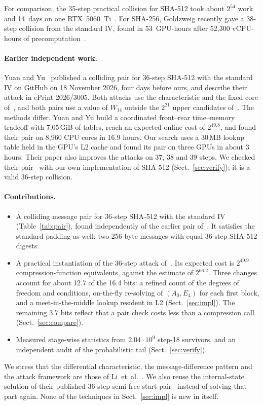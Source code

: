 \documentclass[11pt]{article}
\begin{document}
For comparison, the 35-step practical collision for SHA-512 took about $2^{54}$ work and 14~days on one RTX~5060~Ti~\cite{LLWS26}. For SHA-256, Goldzweig recently gave a 38-step collision from the standard IV, found in 53~GPU-hours after 52{,}300 vCPU-hours of precomputation~\cite{Gol26}.

\paragraph{Earlier independent work.} Yuan and Yu~\cite{YY26} published a colliding pair for 36-step SHA-512 with the standard IV on GitHub on 18 November 2026, four days before ours, and describe their attack in ePrint 2026/3005. Both attacks use the characteristic and the fixed core of~\cite{LZLLQZ26}, and both pairs use a value of $W_{14}$ outside the $2^{21}$ upper candidates of~\cite{LZLLQZ26}. The methods differ. Yuan and Yu build a coordinated front--rear time--memory tradeoff with 7.05\,GiB of tables, reach an expected online cost of $2^{49.8}$, and found their pair on 8{,}960 CPU cores in 16.9 hours. Our search uses a 30\,MB lookup table held in the GPU's L2 cache and found its pair on three GPUs in about 3 hours. Their paper also improves the attacks on 37, 38 and 39 steps. We checked their pair~\cite[Table~7]{YY26} with our own implementation of SHA-512 (Sect.~\ref{sec:verify}); it is a valid 36-step collision.

\paragraph{Contributions.}
\begin{itemize}
\item A colliding message pair for 36-step SHA-512 with the standard IV (Table~\ref{tab:pair}), found independently of the earlier pair of~\cite{YY26}. It satisfies the standard padding as well: two 256-byte messages with equal 36-step SHA-512 digests.
\item A practical instantiation of the 36-step attack of~\cite{LZLLQZ26}. Its expected cost is $2^{49.9}$ compression-function equivalents, against the estimate of $2^{66.2}$. Three changes account for about 12.7 of the 16.4 bits: a refined count of the degrees of freedom and conditions, on-the-fly re-solving of $(A_0,E_4)$ for each first block, and a meet-in-the-middle lookup resident in L2 (Sect.~\ref{sec:impl}). The remaining 3.7 bits reflect that a pair check costs less than a compression call (Sect.~\ref{sec:compare}).
\item Measured stage-wise statistics from $2.04\cdot 10^{9}$ step-18 survivors, and an independent audit of the probabilistic tail (Sect.~\ref{sec:verify}).
\end{itemize}
We stress that the differential characteristic, the message-difference pattern and the attack framework are those of Li~et~al.~\cite{LZLLQZ26,LLWS26}. We also reuse the internal-state solution of their published 36-step semi-free-start pair~\cite[Table~14]{LZLLQZ26} instead of solving that part again. None of the techniques in Sect.~\ref{sec:impl} is new in itself.
\end{document}

